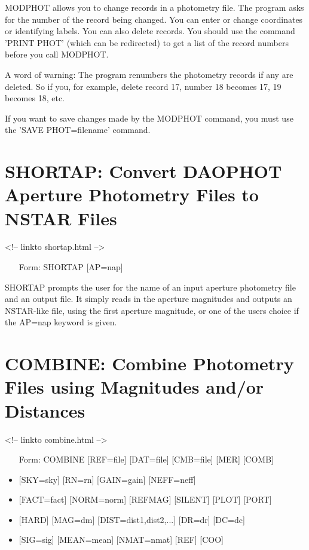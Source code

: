MODPHOT allows you to change records in a photometry file. The program asks
for the number of the record being changed. You can enter or change
coordinates or identifying labels.  You can also delete records. You should
use the command 'PRINT PHOT' (which can be redirected) to get a list of the
record numbers before you call MODPHOT.

A word of warning: The program renumbers the photometry records if any are
deleted.  So if you, for example, delete record 17, number 18 becomes 17,
19 becomes 18, etc.

If you want to save changes made by the MODPHOT command, you must use the
'SAVE PHOT=filename' command.

\section{SHORTAP: Convert DAOPHOT Aperture Photometry Files to NSTAR Files}
\begin{rawhtml}
<!-- linkto shortap.html -->
\end{rawhtml}
\begin{itemize}
  \item[Form: SHORTAP {[AP=nap]}\hfill]{}
\end{itemize}

SHORTAP prompts the user for the name of an input aperture photometry file
and an output file. It simply reads in the aperture magnitudes and outputs
an NSTAR-like file, using the first aperture magnitude, or one of the users
choice if the AP=nap keyword is given.

\section{COMBINE: Combine Photometry Files using Magnitudes and/or 
        Distances}
\begin{rawhtml}
<!-- linkto combine.html -->
\end{rawhtml}
\begin{itemize}
  \item[Form: COMBINE {[REF=file]} {[DAT=file]} {[CMB=file]} {[MER]} {[COMB]}\hfill]{}
  \item{{[SKY=sky]} {[RN=rn]} {[GAIN=gain]} {[NEFF=neff]}}
  \item{{[FACT=fact]} {[NORM=norm]} {[REFMAG]} {[SILENT]} {[PLOT]} {[PORT]}}
  \item{{[HARD]} {[MAG=dm]} {[DIST=dist1,dist2,...]} {[DR=dr]} {[DC=dc]}}
  \item{{[SIG=sig]} {[MEAN=mean]} {[NMAT=nmat]} {[REF]} {[COO]}}
\end{itemize}

